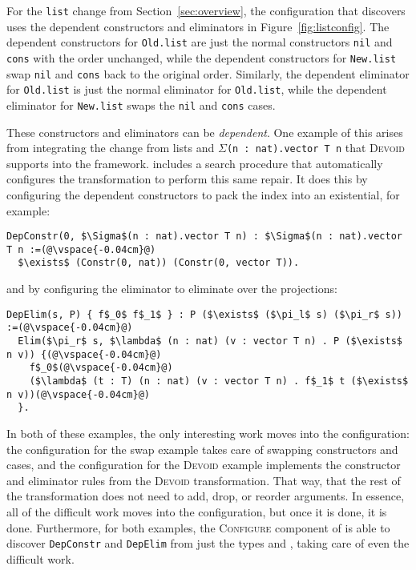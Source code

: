 For the \lstinline{list} change from Section~\ref{sec:overview},
the configuration that \toolname discovers uses the dependent constructors
and eliminators in Figure~\ref{fig:listconfig}. The dependent constructors for \lstinline{Old.list}
are just the normal constructors \lstinline{nil} and \lstinline{cons} with the order unchanged,
while the dependent constructors for \lstinline{New.list} swap \lstinline{nil} and \lstinline{cons}
back to the original order.
Similarly, the dependent eliminator for \lstinline{Old.list} is just the normal eliminator for \lstinline{Old.list},
while the dependent eliminator for \lstinline{New.list} swaps the \lstinline{nil} and \lstinline{cons} cases.

These constructors and eliminators can be \textit{dependent}.
One example of this arises from integrating the change from lists and $\Sigma$\lstinline{(n : nat).vector T n} that
\textsc{Devoid} supports into the \toolname framework.
\toolname includes a search procedure that automatically configures the \toolname  
transformation to perform this same repair.
It does this by configuring the dependent constructors to pack the index into an existential, for example:

\begin{lstlisting}
DepConstr(0, $\Sigma$(n : nat).vector T n) : $\Sigma$(n : nat).vector T n :=(@\vspace{-0.04cm}@)
  $\exists$ (Constr(0, nat)) (Constr(0, vector T)).
\end{lstlisting}
and by configuring the eliminator to eliminate over the projections:

\begin{lstlisting}
DepElim(s, P) { f$_0$ f$_1$ } : P ($\exists$ ($\pi_l$ s) ($\pi_r$ s)) :=(@\vspace{-0.04cm}@)
  Elim($\pi_r$ s, $\lambda$ (n : nat) (v : vector T n) . P ($\exists$ n v)) {(@\vspace{-0.04cm}@)
    f$_0$(@\vspace{-0.04cm}@)
    ($\lambda$ (t : T) (n : nat) (v : vector T n) . f$_1$ t ($\exists$ n v))(@\vspace{-0.04cm}@)
  }. 
\end{lstlisting}

In both of these examples, the only interesting work moves into the configuration:
the configuration for the swap example takes care of swapping constructors and cases,
and the configuration for the \textsc{Devoid} example implements the constructor and eliminator rules from the \textsc{Devoid} transformation.
That way, that the rest of the \toolname transformation does not need to add, drop, or reorder arguments.
In essence, all of the difficult work moves into the configuration, but once it is done, it is done.
Furthermore, for both examples, the \textsc{Configure} component of \toolname is able to discover \lstinline{DepConstr}
and \lstinline{DepElim} from just the types \A and \B, taking care of even the difficult work.

